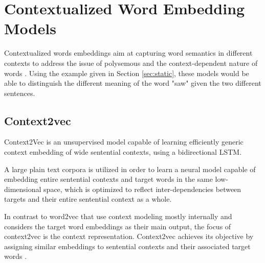        

    
    \section{Contextualized Word Embedding Models}
    \label{sec:context}    
        \par Contextualized words embeddings aim at capturing word semantics in different contexts to address the issue of polysemous and the context-dependent nature of words \cite{Batista2018}. Using the example given in  Section \ref{sec:static}, these models would be able to distinguish the different meaning of the word "saw" given the two different sentences.

        \subsection{Context2vec}
        
            \par Context2Vec is an unsupervised model capable of learning efficiently generic context embedding of wide sentential contexts, using a bidirectional LSTM. 

            A large plain text corpora is utilized in order to learn a neural model capable of embedding  entire  sentential  contexts  and  target words in the same low-dimensional space, which is optimized to reflect inter-dependencies between targets and their entire sentential context as a whole. 
            
            
            In contrast to word2vec that use context modeling mostly internally and considers the target word embeddings as their main output, the focus of context2vec is the context representation. Context2vec achieves its objective by assigning similar embeddings to sentential contexts and their associated target words \cite{Melamud2016}.


